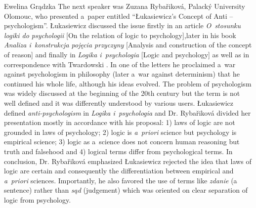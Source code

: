 \begin{editorialeng}{Ewelina Grądzka}
The next speaker was Zuzana Rybařiková, Palacký University Olomouc, who presented a~paper entitled “Łukasiewicz’s Concept of Anti – psychologism”. Łukasiewicz discussed the issue firstly in an article \textit{O~stosunku logiki do psychologii} [On the relation of logic to psychology],later in his book \textit{Analiza i~konstrukcja pojęcia przyczyny} [Analysis and construction of the concept of reason]
\parencite[][]{lukasiewicz_analiza_1906} %
 and finally in \textit{Logika i~psychologia} [Logic and psychology] as well as in correspondence with Twardowski 
\parencite[][]{lukasiewicz_logika_1998}. %
 In one of the letters he proclaimed a~war against psychologism in philosophy (later a~war against determinism) that he continued his whole life, although his ideas evolved. The problem of psychologism was widely discussed at the beginning of the 20th century but the term is not well defined and it was differently understood by various users. Łukasiewicz defined \textit{anti-psychologism} in \textit{Logika i~psychologia} and Dr. Rybařiková divided her presentation mostly in accordance with his proposal: 1) laws of logic are not grounded in laws of psychology; 2) logic is \textit{a~priori} science but psychology is empirical science; 3) logic as a~science does not concern human reasoning but truth and falsehood and 4) logical terms differ from psychological terms. In conclusion, Dr. Rybařiková emphasized Łukasiewicz rejected the idea that laws of logic are certain and consequently the differentiation between empirical and \textit{a~priori} sciences. Importantly, he also favored the use of terms like \textit{zdanie} (a sentence) rather than \textit{sąd} (judgement) which was oriented on clear separation of logic from psychology.


\end{editorialeng}
